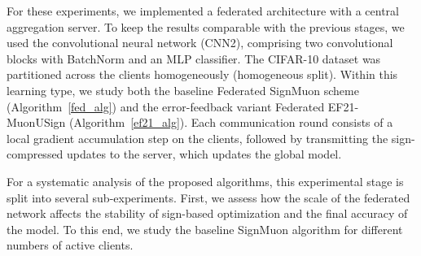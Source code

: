 \documentclass[letterpaper]{article} %
\begin{document}
For these experiments, we implemented a federated architecture with a central aggregation server. To keep the results comparable with the previous stages, we used the convolutional neural network (CNN2), comprising two convolutional blocks with BatchNorm and an MLP classifier. The CIFAR-10 dataset was partitioned across the clients homogeneously (homogeneous split). Within this learning type, we study both the baseline Federated SignMuon scheme (Algorithm~\ref{fed_alg}) and the error-feedback variant Federated EF21-MuonUSign (Algorithm~\ref{ef21_alg}). Each communication round consists of a local gradient accumulation step on the clients, followed by transmitting the sign-compressed updates to the server, which updates the global model.


For a systematic analysis of the proposed algorithms, this experimental stage is split into several sub-experiments. First, we assess how the scale of the federated network affects the stability of sign-based optimization and the final accuracy of the model. To this end, we study the baseline SignMuon algorithm for different numbers of active clients.
\end{document}
